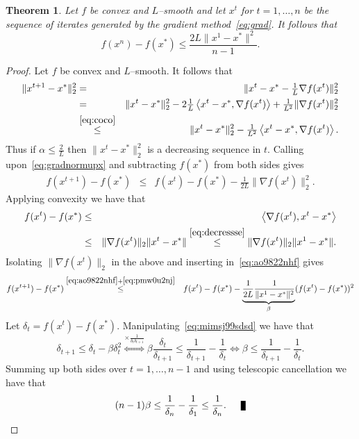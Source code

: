 \documentclass[11pt]{article}
\newcommand{\qed}{\nobreak \ifvmode \relax \else
      \ifdim\lastskip<1.5em \hskip-\lastskip
      \hskip1.5em plus0em minus0.5em \fi \nobreak
      \vrule height0.75em width0.5em depth0.25em\fi}
\newcommand{\norm}[1]{\lVert#1\rVert}
\newcommand{\dotprod}[1]{\left< #1\right>}
\newtheorem{theorem}{Theorem}[section]
\begin{document}
\begin{theorem}\label{theo:convgrad}
Let $f$ be convex and $L$--smooth and let  $x^t$ for $t=1,\ldots, n$ be the sequence of iterates generated by the gradient method~\eqref{eq:grad}. It follows that
\begin{equation}
f(x^n)-f(x^*) \leq \frac{2L\norm{x^1-x^*} ^2}{n-1}.
\end{equation}
\end{theorem}
\begin{proof}
Let $f$ be convex and $L$--smooth. It follows that
\begin{eqnarray*}
\norm{x^{t+1}-x^*}_2^2 &=& \norm{x^t -x^*- \tfrac{1}{L} \nabla f(x^t)}_2^2 \\
& =& \norm{x^{t}-x^*}_2^2-2\tfrac{1}{L} \dotprod{x^t -x^*, \nabla f(x^t)} + \tfrac{1}{L^2}\norm{\nabla f(x^t)}_2^2\\
  & \overset{\eqref{eq:coco}}{\leq} & \norm{x^{t}-x^*}_2^2-\tfrac{1}{L^2}\dotprod{x^t -x^*, \nabla f(x^t)}.\label{eq:decressse}
\end{eqnarray*}
Thus if $\alpha \leq \frac{2}{L}$ then $\norm{x^{t}-x^*}_2^2$ is a decreasing sequence in $t.$ Calling upon~\eqref{eq:gradnormupx} and subtracting $f(x^*)$ from both sides gives
\begin{eqnarray}
f(x^{t+1}) -f(x^*) & \leq &  f(x^t)-f(x^*)-  \frac{1}{2L}\norm{\nabla f(x^t)}_2^2.\label{eq:ao9822nhf}
\end{eqnarray}
Applying convexity we have that
\begin{eqnarray}
 f(x^t)-f(x^*) & \leq & \dotprod{\nabla f(x^t), x^t-x^*} \nonumber\\
 & \leq & \norm{\nabla f(x^t)}_2 \norm{x^t-x^*} \overset{\eqref{eq:decressse}}{\leq} \norm{\nabla f(x^t)}_2 \norm{x^1-x^*} .\label{eq:pmw0u2nj}
\end{eqnarray}
Isolating $\norm{\nabla f(x^t)}_2$ in the above and 
inserting in~\eqref{eq:ao9822nhf} gives
\begin{eqnarray}
f(x^{t+1}) -f(x^*) & \overset{\eqref{eq:ao9822nhf}+\eqref{eq:pmw0u2nj}}{\leq} &  f(x^t)-f(x^*)-  \underbrace{\frac{1}{2L}\frac{1}{\norm{x^1-x^*} ^2}}_{\beta} (f(x^t)-f(x^*))^2
\label{eq:mimsj99sdsd}
\end{eqnarray}
Let $\delta_t = f(x^t)-f(x^*).$ Manipulating~\eqref{eq:mimsj99sdsd} we have that
\[\delta_{t+1} \leq \delta_t - \beta \delta_t^2 \overset{\times \tfrac{1}{\delta_t \delta_{t+1}}}{\Leftrightarrow }
\beta \frac{\delta_t}{\delta_{t+1}} \leq \frac{1}{\delta_{t+1}} -\frac{1}{\delta_{t}}
 \Leftrightarrow 
\beta\leq \frac{1}{\delta_{t+1}} -\frac{1}{\delta_{t}}. 
 \] 
 Summing up both sides over $t= 1, \ldots, n-1$ and using telescopic cancellation we have that
\[(n-1) \beta \leq \frac{1}{\delta_n} - \frac{1}{\delta_{1}} \leq \frac{1}{\delta_n}.\qed\]
\end{proof}
\end{document}
